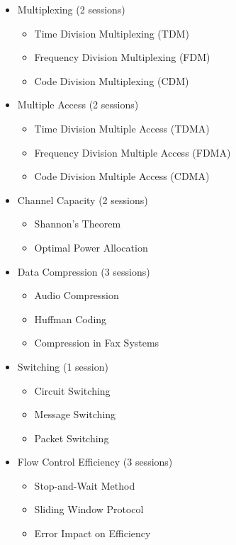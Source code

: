 \documentclass[12pt]{article}
\begin{document}
\begin{itemize}
    \item Multiplexing (2 sessions)
    \begin{itemize}
        \item Time Division Multiplexing (TDM)
        \item Frequency Division Multiplexing (FDM)
        \item Code Division Multiplexing (CDM)
    \end{itemize}
    
    \item Multiple Access (2 sessions)
    \begin{itemize}
        \item Time Division Multiple Access (TDMA)
        \item Frequency Division Multiple Access (FDMA)
        \item Code Division Multiple Access (CDMA)
    \end{itemize}
    
    \item Channel Capacity (2 sessions)
    \begin{itemize}
        \item Shannon's Theorem
        \item Optimal Power Allocation
    \end{itemize}
    
    \item Data Compression (3 sessions)
    \begin{itemize}
        \item Audio Compression
        \item Huffman Coding
        \item Compression in Fax Systems
    \end{itemize}
    
    \item Switching (1 session)
    \begin{itemize}
        \item Circuit Switching
        \item Message Switching
        \item Packet Switching
    \end{itemize}
    
    \item Flow Control Efficiency (3 sessions)
    \begin{itemize}
        \item Stop-and-Wait Method
        \item Sliding Window Protocol
        \item Error Impact on Efficiency
    \end{itemize}
\end{itemize}
\end{document}
